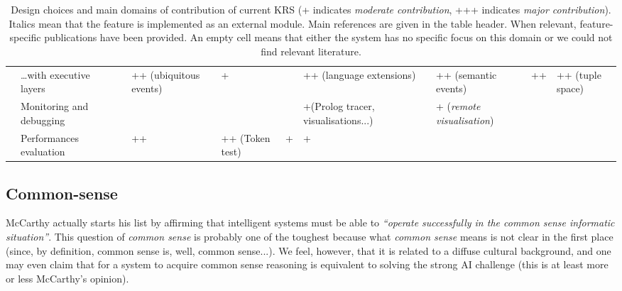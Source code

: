 \documentclass[journal]{IEEEtran}
\begin{document}
\begin{landscape}
\begin{table}
\begin{center}
\begin{tabular}{p{0.2cm}p{3.4cm}p{1.6cm}p{1.3cm}p{1.7cm}p{1.5cm}p{2cm}p{2cm}p{2cm}p{1.4cm}p{1.8cm}}
                                                      & \ldots with executive layers &                           & ++ (ubiquitous events)      & +                           &                             & ++ (language extensions) \cite{Beetz2010} &                                          & ++ (semantic events)                          & ++                            & ++ (tuple space)               \\
                                                          & Monitoring and debugging &                           &                             &                             &                             & +(Prolog tracer, visualisations...)&                                                 & + ({\em remote visualisation})                &                               &                                \\
                                                           & Performances evaluation &                           & ++ \cite{Hawes2008}         & ++ (Token test)             & +                           & + \cite{Tenorth2011}               &                                                 &                                               &                               &                                \\

\bottomrule

\end{tabular}
\end{center}

\caption{Design choices and main domains of contribution of current KRS (+
indicates \emph{moderate contribution}, +++ indicates \emph{major
contribution}). Italics mean that the feature is implemented as an external
module. Main references are given in the table header. When relevant,
feature-specific publications have been provided.  An empty cell means that
either the system has no specific focus on this domain or we could not find
relevant literature.}

\label{table|contribution-by-systems}
\end{table}
\end{landscape}


\subsection{Common-sense}
McCarthy actually starts his list by affirming that intelligent systems must be
able to \emph{``operate successfully in the common sense informatic
situation''}. This question of \emph{common sense} is probably one of the
toughest because what \emph{common sense} means is not clear in the first place
(since, by definition, common sense is, well, common sense...). We feel,
however, that it is related to a diffuse cultural background, and one may even
claim that for a system to acquire common sense reasoning is equivalent to
solving the strong AI challenge (this is at least more or less McCarthy's opinion).
\end{document}
